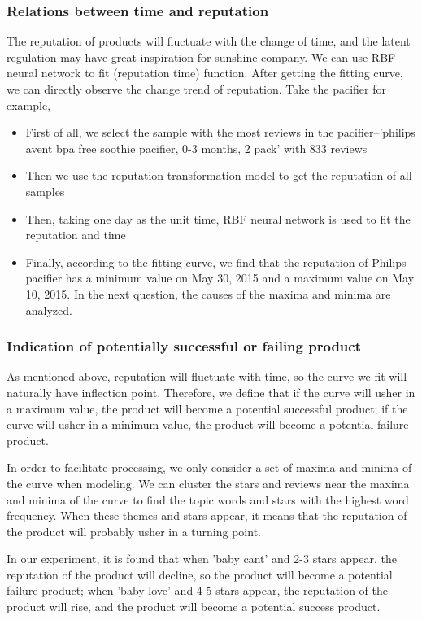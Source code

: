 \documentclass{mcmthesis}
\begin{document}
\subsubsection{Relations between time and reputation}
The reputation of products will fluctuate with the change of time, and the latent regulation may have great inspiration for sunshine company. We can use RBF neural network\cite{li2016nonlinear} to fit (reputation time) function. After getting the fitting curve, we can directly observe the change trend of reputation. Take the pacifier for example,

\begin{itemize}
	\item First of all, we select the sample with the most reviews in the pacifier--'philips avent bpa free soothie pacifier, 0-3 months, 2 pack' with 833 reviews
	\item Then we use the reputation transformation model to get the reputation of all samples
	\item Then, taking one day as the unit time, RBF neural network is used to fit the reputation and time
	\item Finally, according to the fitting curve, we find that the reputation of Philips pacifier has a minimum value on May 30, 2015 and a maximum value on May 10, 2015. In the next question, the causes of the maxima and minima are analyzed.
\end{itemize}

\subsubsection{Indication of potentially successful or failing product}
As mentioned above, reputation will fluctuate with time, so the curve we fit will naturally have inflection point. Therefore, we define that if the curve will usher in a maximum value, the product will become a potential successful product; if the curve will usher in a minimum value, the product will become a potential failure product.

In order to facilitate processing, we only consider a set of maxima and minima of the curve when modeling. We can cluster the stars and reviews near the maxima and minima of the curve to find the topic words and stars with the highest word frequency. When these themes and stars appear, it means that the reputation of the product will probably usher in a turning point.

In our experiment, it is found that when 'baby cant' and 2-3 stars appear, the reputation of the product will decline, so the product will become a potential failure product; when 'baby love' and 4-5 stars appear, the reputation of the product will rise, and the product will become a potential success product.
\end{document}

